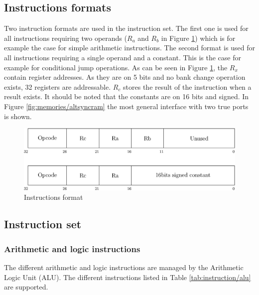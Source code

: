 \subsection{Instructions formats}

Two instruction formats are used in the instruction set.  The first one is used for all instructions 
requiring two operands ($R_a$ and $R_b$ in Figure \ref{fig:instructions/format}) which is for example 
the case for simple arithmetic instructions. The second format is used for all instructions 
requiring a single operand and a constant. This is the case for example for conditional jump 
operations. As can be seen in Figure \ref{fig:instructions/format}, the $R_x$ contain register 
addresses. As they are on 5 bits and no bank change operation exists, 32 registers are addressable. 
$R_c$ stores the result of the instruction when a result exists. It should be noted that the 
constants are on 16 bits and signed. In Figure \ref{fig:memories/altsyncram} the most general interface 
with two true ports is shown.

\begin{figure}[H]
    \centering
    \includegraphics[scale=0.6]{Chapter3-CPU/res/instruction}
    \caption{Instructions format}
    \label{fig:instructions/format}
\end{figure}

\subsection{Instruction set}

\subsubsection*{Arithmetic and logic instructions}

The different arithmetic and logic instructions are managed by the Arithmetic Logic Unit (ALU). The 
different instructions listed in Table \ref{tab:instruction/alu} are supported.

